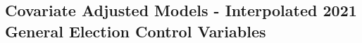 \documentclass[11pt,a4paper]{scrartcl}
\begin{document}
\begin{appendices}
\begin{refsection}
		

		\section{Covariate Adjusted Models - Interpolated 2021 General Election Control Variables}\label{A:2021controls}
		

		\newpage

		\printbibliography[title=Literature from Appendices]


	\end{refsection}

\end{appendices}
\end{document}
